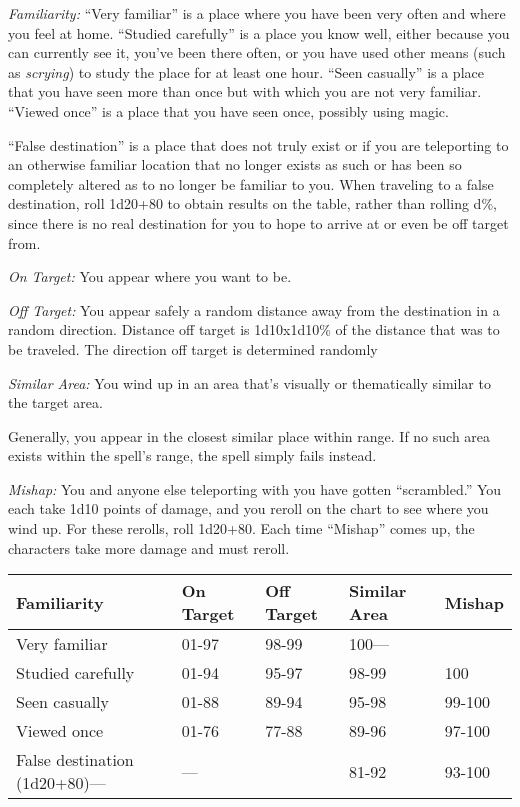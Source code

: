 \documentclass{article}
\begin{document}
\textit{Familiarity: }``Very familiar'' is a place where you have been very often 
and where you feel at home. ``Studied carefully'' is a place you know well, either 
because you can currently see it, you've been there often, or you have used other 
means (such as \textit{scrying}) to study the place for at least one hour. ``Seen 
casually'' is a place that you have seen more than once but with which you are 
not very familiar. ``Viewed once'' is a place that you have seen once, possibly 
using magic. 

``False destination'' is a place that does not truly exist or if you are teleporting 
to an otherwise familiar location that no longer exists as such or has been so 
completely altered as to no longer be familiar to you. When traveling to a false 
destination, roll 1d20+80 to obtain results on the table, rather than rolling d\%, 
since there is no real destination for you to hope to arrive at or even be off 
target from.

\textit{On Target: }You appear where you want to be.

\textit{Off Target: }You appear safely a random distance away from the destination 
in a random direction. Distance off target is 1d10x1d10\% of the distance that 
was to be traveled. The direction off target is determined randomly

\textit{Similar Area: }You wind up in an area that's visually or thematically similar 
to the target area.

Generally, you appear in the closest similar place within range. If no such area 
exists within the spell's range, the spell simply fails instead.

\textit{Mishap: }You and anyone else teleporting with you have gotten ``scrambled.'' 
You each take 1d10 points of damage, and you reroll on the chart to see where you 
wind up. For these rerolls, roll 1d20+80. Each time ``Mishap'' comes up, the characters 
take more damage and must reroll.

\begin{tabular}{|>{\raggedright}p{111pt}|>{\raggedright}p{43pt}|>{\raggedright}p{44pt}|>{\raggedright}p{54pt}|>{\raggedright}p{31pt}|}
\hline
F\textbf{amiliarity} & O\textbf{n Target} & O\textbf{ff Target} & S\textbf{imilar 
Area} & M\textbf{ishap}\tabularnewline
\hline
Very familiar & 01-97 & 98-99 & 100--- & \tabularnewline
\hline
Studied carefully & 01-94 & 95-97 & 98-99 & 100\tabularnewline
\hline
Seen casually & 01-88 & 89-94 & 95-98 & 99-100\tabularnewline
\hline
Viewed once & 01-76 & 77-88 & 89-96 & 97-100\tabularnewline
\hline
False destination (1d20+80)--- & --- &  & 81-92 & 93-100\tabularnewline
\hline
\end{tabular}
\end{document}
